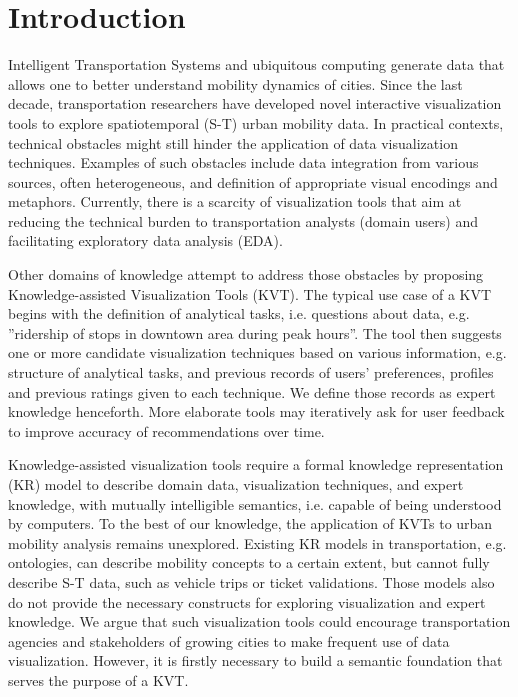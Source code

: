 \section{Introduction}

Intelligent Transportation Systems and ubiquitous computing generate data that allows one to better understand mobility dynamics of cities. Since the last decade, transportation researchers have developed novel interactive visualization tools to explore spatiotemporal (S-T) urban mobility data. In practical contexts, technical obstacles might still hinder the application of data visualization techniques. Examples of such obstacles include data integration from various sources, often heterogeneous, and definition of appropriate visual encodings and metaphors. Currently, there is a scarcity of visualization tools that aim at reducing the technical burden to transportation analysts (domain users) and facilitating exploratory data analysis (EDA).

Other domains of knowledge attempt to address those obstacles by proposing Knowledge-assisted Visualization Tools (KVT). The typical use case of a KVT begins with the definition of analytical tasks, i.e. questions about data, e.g. ''ridership of stops in downtown area during peak hours''. The tool then suggests one or more candidate visualization techniques based on various information, e.g. structure of analytical tasks, and previous records of users' preferences, profiles and previous ratings given to each technique. We define those records as expert knowledge henceforth. More elaborate tools may iteratively ask for user feedback to improve accuracy of recommendations over time.

Knowledge-assisted visualization tools require a formal knowledge representation (KR) model to describe domain data, visualization techniques, and expert knowledge, with mutually intelligible semantics, i.e. capable of being understood by computers. To the best of our knowledge, the application of KVTs to urban mobility analysis remains unexplored. Existing KR models in transportation, e.g. ontologies, can describe mobility concepts to a certain extent, but cannot fully describe S-T data, such as vehicle trips or ticket validations. Those models also do not provide the necessary constructs for exploring visualization and expert knowledge. We argue that such visualization tools could encourage transportation agencies and stakeholders of growing cities to make frequent use of data visualization. However, it is firstly necessary to build a semantic foundation that serves the purpose of a KVT.

